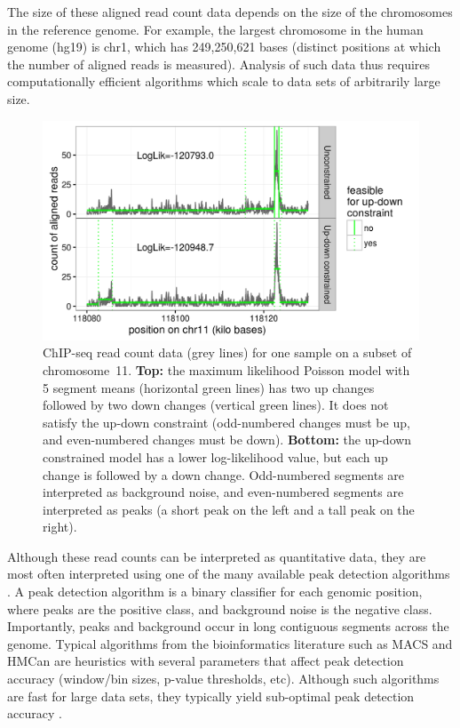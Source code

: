 \documentclass[twoside,11pt]{article}
\begin{document}
The size of these aligned read count data depends on the size of the
chromosomes in the reference genome. For example, the largest
chromosome in the human genome (hg19) is chr1, which has 249,250,621
bases (distinct positions at which the number of aligned reads is
measured). Analysis of such data thus requires computationally
efficient algorithms which scale to data sets of arbitrarily large
size.

\begin{figure}[t!]
  \centering
  \includegraphics[width=\textwidth]{figure-data-models}
  \vskip -0.5cm
  \caption{ChIP-seq read count data (grey lines) for one sample on a
    subset of chromosome~11. \textbf{Top:} the maximum likelihood
    Poisson model with 5 segment means (horizontal green lines) has
    two up changes followed by two down changes (vertical green
    lines). It does not satisfy the up-down constraint (odd-numbered
    changes must be up, and even-numbered changes must be
    down). \textbf{Bottom:} the up-down constrained model has a lower
    log-likelihood value, but each up change is followed by a down
    change. Odd-numbered segments are interpreted as background noise,
    and even-numbered segments are interpreted as peaks (a short peak
    on the left and a tall peak on the right).}
  \label{fig:data-models}
\end{figure}

Although these read counts can be interpreted as quantitative data,
they are most often interpreted using one of the many available peak
detection algorithms \citep{evaluation2010, rye2010manually,
  chip-seq-bench}. A peak detection algorithm is a binary classifier
for each genomic position, where peaks are the positive class, and
background noise is the negative class. Importantly, peaks and
background occur in long contiguous segments across the
genome. Typical algorithms from the bioinformatics literature such as
MACS \citep{MACS} and HMCan \citep{HMCan} are heuristics with several
parameters that affect peak detection accuracy (window/bin sizes,
p-value thresholds, etc). Although such algorithms are fast for large
data sets, they typically yield sub-optimal peak detection accuracy
\citep{HOCKING2016-chipseq}.
\end{document}
